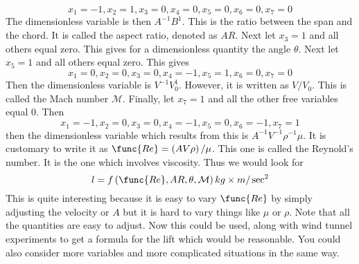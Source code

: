 \begin{equation*}
x_{1}=-1,x_{2}=1,x_{3}=0,x_{4}=0,x_{5}=0,x_{6}=0,x_{7}=0
\end{equation*}
The dimensionless variable is then $A^{-1}B^{1}$. This is the ratio between
the span and the chord. It is called the aspect ratio, denoted as $AR$. Next
let $x_{3}=1$ and all others equal zero. This gives for a dimensionless
quantity the angle $\theta $. Next let $x_{5}=1$ and all others equal zero.
This gives
\begin{equation*}
x_{1}=0,x_{2}=0,x_{3}=0,x_{4}=-1,x_{5}=1,x_{6}=0,x_{7}=0
\end{equation*}
Then the dimensionless variable is $V^{-1}V_{0}^{1}.$ However, it is written
as $V/V_{0}$. This is called the Mach number $\mathcal{M}$. Finally, let 
$x_{7}=1$ and all the other free variables equal 0. Then 
\begin{equation*}
x_{1}=-1,x_{2}=0,x_{3}=0,x_{4}=-1,x_{5}=0,x_{6}=-1,x_{7}=1
\end{equation*}
then the dimensionless variable which results from this is $A^{-1}V^{-1}\rho
^{-1}\mu .$ It is customary to write it as $\func{Re}=\left( AV\rho \right)
/\mu $. This one is called the Reynold's number. It is the one which
involves viscosity. Thus we would look for 
\begin{equation*}
l=f\left( \func{Re},AR,\theta ,\mathcal{M}\right) kg\times m/\sec ^{2}
\end{equation*}
This is quite interesting because it is easy to vary $\func{Re}$ by simply
adjusting the velocity or $A$ but it is hard to vary things like $\mu $ or $%
\rho $. Note that all the quantities are easy to adjust. Now this could be
used, along with wind tunnel experiments to get a formula for the lift which
would be reasonable. You could also consider more variables and more
complicated situations in the same way.